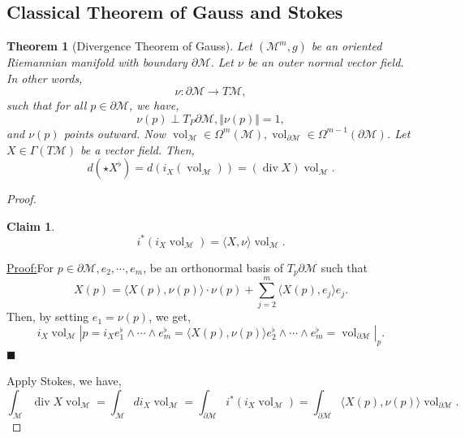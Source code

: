 \documentclass[8pt]{article}
\newtheorem{theorem}{Theorem} [section]
\newtheorem{claim}{Claim}
\newenvironment{claimproof}[1]{\par\noindent\underline{Proof:}\space#1}{\hfill $\blacksquare$}
\DeclareMathOperator{\vol}{vol}
\DeclareMathOperator{\diverg}{div}
\newcommand{\norm}[1]{\Vert #1 \Vert}
\newcommand{\M}[0]{\mathcal{M}}
\begin{document}
\subsection{Classical Theorem of Gauss and Stokes}

\begin{theorem}[Divergence Theorem of Gauss]
  \label{theorem_divergence_gauss}
  Let $(\M^m,g)$ be an oriented Riemannian manifold with boundary $\partial\M$. Let $\nu$ be an outer normal vector field. In other words,
  \begin{equation*}
    \nu:\partial\M\to T\M,
  \end{equation*}
  such that for all $p\in\partial\M$, we have,
  \begin{equation*}
    \nu(p)\perp T_P\partial\M,\norm{\nu(p)}=1,
  \end{equation*}
  and $\nu(p)$ points outward. Now $\vol_\M\in\Omega^m(\M),\vol_{\partial\M}\in\Omega^{m-1}(\partial\M)$. Let $X\in \Gamma(T\M)$ be a vector field. Then,
  \begin{equation*}
    d(\star X^\flat)=d(i_X(\vol_\M)) = (\diverg X)\vol_\M.
  \end{equation*}
\end{theorem}
\setcounter{claim}{0}
\begin{proof}
  \begin{claim}
  \begin{equation*}
    i^*(i_X\vol_\M) = \langle X,\nu\rangle\vol_\M.
  \end{equation*}
  \end{claim}
  \begin{claimproof}
    For $p\in\partial\M,e_2,\cdots,e_m$, be an orthonormal basis of $T_p\partial\M$ such that 
    \begin{equation*}
      X(p) = \langle X(p),\nu(p)\rangle\cdot\nu(p)+\sum_{j=2}^m\langle X(p),e_j\rangle e_j.
    \end{equation*}
    Then, by setting $e_1 = \nu(p)$, we get,
    \begin{equation*}
      i_X\vol_{\M}|p = i_Xe_1^\flat\wedge\cdots\wedge e_m^\flat = \langle X(p),\nu(p)\rangle e_2^\flat\wedge\cdots\wedge e_m^\flat = \vol_{\partial\M}|_p.
    \end{equation*}
  \end{claimproof}
  \par Apply Stokes, we have,
  \begin{equation*}
    \int_\M \diverg X\vol_\M = \int_\M di_X\vol_\M=\int_{\partial\M}i^*(i_X\vol_\M) = \int_{\partial\M}\langle X(p),\nu(p)\rangle\vol_{\partial\M}.
  \end{equation*}
\end{proof}
\end{document}
